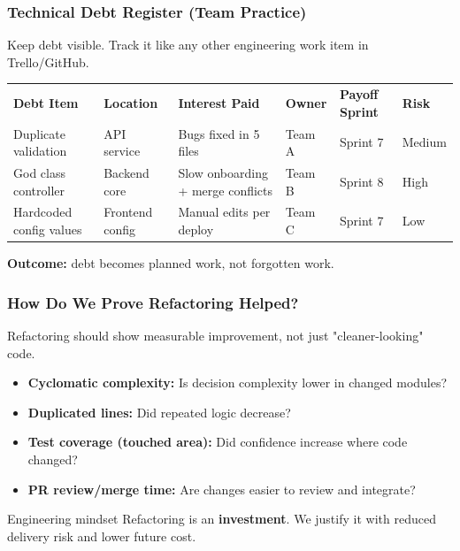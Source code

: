 \documentclass[xcolor=table]{beamer}
\begin{document}
\begin{frame}
    \frametitle{Technical Debt Register (Team Practice)}
    \small
    Keep debt visible. Track it like any other engineering work item in Trello/GitHub.
    \footnotesize
    \vspace{0.2cm}
    \begin{center}
    \begin{tabular}{p{} p{} p{} p{} p{} p{}}
        \rowcolor{blue!20}
        \textbf{Debt Item} & \textbf{Location} & \textbf{Interest Paid} & \textbf{Owner} & \textbf{Payoff Sprint} & \textbf{Risk} \\
        Duplicate validation & API service & Bugs fixed in 5 files & Team A & Sprint 7 & Medium \\
        God class controller & Backend core & Slow onboarding + merge conflicts & Team B & Sprint 8 & High \\
        Hardcoded config values & Frontend config & Manual edits per deploy & Team C & Sprint 7 & Low \\
    \end{tabular}
    \end{center}

    \vspace{0.2cm}
    \textbf{Outcome:} debt becomes planned work, not forgotten work.
\end{frame}

\begin{frame}
    \frametitle{How Do We Prove Refactoring Helped?}
    Refactoring should show measurable improvement, not just "cleaner-looking" code.

    \vspace{0.3cm}
    \begin{itemize}
        \item \textbf{Cyclomatic complexity:} Is decision complexity lower in changed modules?
        \item \textbf{Duplicated lines:} Did repeated logic decrease?
        \item \textbf{Test coverage (touched area):} Did confidence increase where code changed?
        \item \textbf{PR review/merge time:} Are changes easier to review and integrate?
    \end{itemize}

    \vspace{0.3cm}
    \begin{block}{Engineering mindset}
        Refactoring is an \textbf{investment}. We justify it with reduced delivery risk and lower future cost.
    \end{block}
\end{frame}
\end{document}
